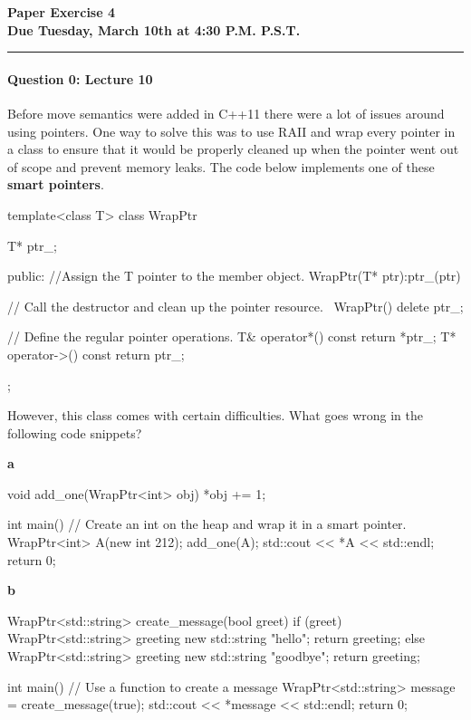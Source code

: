 \documentclass[12pt,letterpaper,twoside]{article}
\begin{document}
{\centering \textbf{Paper Exercise 4\\ Due Tuesday, March 10th at 4:30
    P.M. P.S.T. \\}}
\vspace*{-8pt}\noindent\rule{\linewidth}{1pt}

\paragraph{Question 0: Lecture 10}

Before move semantics were added in C++11 there were a lot of issues around using pointers. One way to solve this was to use RAII and wrap every pointer in a class to ensure that it would be properly cleaned up when the pointer went out of scope and prevent memory leaks. The code below implements one of these \textbf{smart pointers}.

\begin{cpp}
template<class T>
class WrapPtr {
	T* ptr_;

	public:
	//Assign the T pointer to the member object.
	WrapPtr(T* ptr):ptr_(ptr)	{

	}
	// Call the destructor and clean up the pointer resource.
	~WrapPtr() {
		delete ptr_;
	}

	// Define the regular pointer operations.
	T& operator*() const { return *ptr_; }
	T* operator->() const { return ptr_; }
};	
\end{cpp}

However, this class comes with certain difficulties. What goes wrong in the following code snippets?

\textbf{a}
\begin{cpp}
void add_one(WrapPtr<int> obj) {
  *obj += 1;
}

int main() {
  // Create an int on the heap and wrap it in a smart pointer.
  WrapPtr<int> A(new int {212});
  add_one(A);
  std::cout << *A << std::endl;
  return 0;
}
\end{cpp}

\begin{solution}

\end{solution}



\textbf{b}
\begin{cpp}
WrapPtr<std::string> create_message(bool greet)
{
  if (greet) {
    WrapPtr<std::string> greeting {new std::string {"hello"}};
    return greeting;
  } else {
    WrapPtr<std::string> greeting {new std::string {"goodbye"}};
    return greeting;
  }
}

int main()
{
  // Use a function to create a message
  WrapPtr<std::string> message = create_message(true);
  std::cout << *message << std::endl;
  return 0;
}
\end{cpp}
\end{document}
